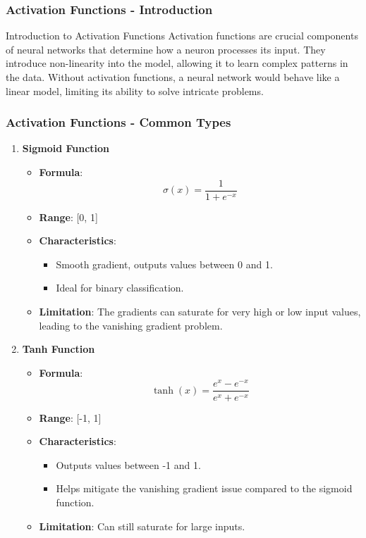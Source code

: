 \documentclass[aspectratio=169]{beamer}
\begin{document}
\begin{frame}[fragile]
    \frametitle{Activation Functions - Introduction}
    \begin{block}{Introduction to Activation Functions}
        Activation functions are crucial components of neural networks that determine how a neuron processes its input. 
        They introduce non-linearity into the model, allowing it to learn complex patterns in the data. 
        Without activation functions, a neural network would behave like a linear model, limiting its ability to solve intricate problems.
    \end{block}
\end{frame}

\begin{frame}[fragile]
    \frametitle{Activation Functions - Common Types}
    \begin{enumerate}
        \item \textbf{Sigmoid Function}
            \begin{itemize}
                \item \textbf{Formula}: 
                \[
                \sigma(x) = \frac{1}{1 + e^{-x}}
                \]
                \item \textbf{Range}: [0, 1]
                \item \textbf{Characteristics}: 
                \begin{itemize}
                    \item Smooth gradient, outputs values between 0 and 1.
                    \item Ideal for binary classification.
                \end{itemize}
                \item \textbf{Limitation}: The gradients can saturate for very high or low input values, leading to the vanishing gradient problem.
            \end{itemize}
        
        \item \textbf{Tanh Function}
            \begin{itemize}
                \item \textbf{Formula}:
                \[
                \tanh(x) = \frac{e^x - e^{-x}}{e^x + e^{-x}}
                \]
                \item \textbf{Range}: [-1, 1]
                \item \textbf{Characteristics}: 
                \begin{itemize}
                    \item Outputs values between -1 and 1.
                    \item Helps mitigate the vanishing gradient issue compared to the sigmoid function.
                \end{itemize}
                \item \textbf{Limitation}: Can still saturate for large inputs.
            \end{itemize}
        

\end{enumerate}
\end{frame}
\end{document}
